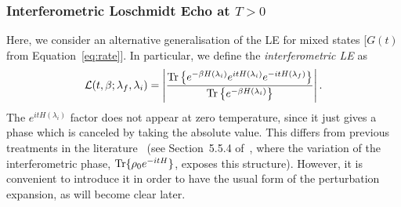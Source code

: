 \subsubsection{Interferometric Loschmidt Echo at $T>0$}

Here, we consider an alternative generalisation of the LE for mixed states [$G(t)$ from Equation~\eqref{eq:rate}]. In particular, we define the {\em interferometric LE} as
\begin{eqnarray}
\mathcal{L}(t,\beta ;\lambda_{f},\lambda_i)=\left|\frac{\text{Tr}\left\{e^{-\beta H(\lambda_i)} e^{i tH(\lambda_i)}e^{-i t H(\lambda_f)}\right\}}{\text{Tr} \left\{e^{-\beta H(\lambda_i)}\right\}}\right|.
\end{eqnarray}
The $e^{it H(\lambda_i)}$ factor does not appear at zero temperature, since it just gives a phase which is canceled by taking the absolute value.  This differs from previous treatments in the literature~\cite{bud:hey:16} (see Section~5.5.4 of~\cite{chr:jam:12}, where the variation of the interferometric phase, $\text{Tr}\{\rho_0 e^{-it H}\}$, exposes this structure). However, it is convenient to introduce it in order to have the usual form of the perturbation expansion, as will become clear later.

